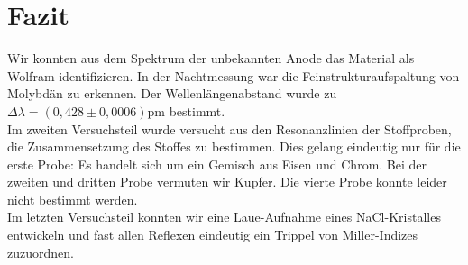 \section{Fazit}
Wir konnten aus dem Spektrum der unbekannten Anode das Material als Wolfram identifizieren. In der Nachtmessung war die Feinstrukturaufspaltung von Molybdän zu erkennen. Der Wellenlängenabstand wurde zu $\Delta \lambda = (0,428 \pm 0,0006) \si{\pico\meter}$ bestimmt.\\
Im zweiten Versuchsteil wurde versucht aus den Resonanzlinien der Stoffproben, die Zusammensetzung des Stoffes zu bestimmen. Dies gelang eindeutig nur für die erste Probe: Es handelt sich um ein Gemisch aus Eisen und Chrom. Bei der zweiten und dritten Probe vermuten wir Kupfer. Die vierte Probe konnte leider nicht bestimmt werden.\\
Im letzten Versuchsteil konnten wir eine Laue-Aufnahme eines NaCl-Kristalles entwickeln und fast allen Reflexen eindeutig ein Trippel von Miller-Indizes zuzuordnen. 